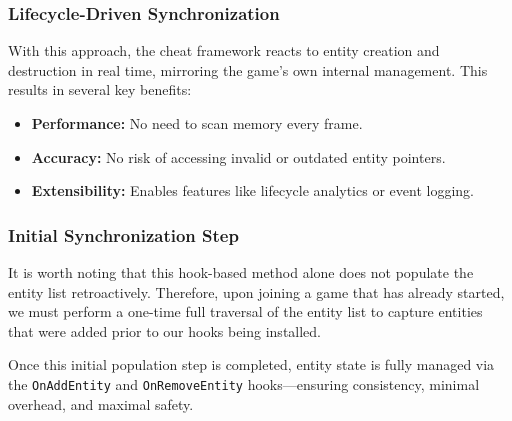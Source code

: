 \subsubsection*{Lifecycle-Driven Synchronization}

With this approach, the cheat framework reacts to entity creation and destruction in real time, mirroring the game’s own internal management. This results in several key benefits:

\begin{itemize}
    \item \textbf{Performance:} No need to scan memory every frame.
    \item \textbf{Accuracy:} No risk of accessing invalid or outdated entity pointers.
    \item \textbf{Extensibility:} Enables features like lifecycle analytics or event logging.
\end{itemize}

\subsubsection*{Initial Synchronization Step}

It is worth noting that this hook-based method alone does not populate the entity list retroactively. Therefore, upon joining a game that has already started, we must perform a one-time full traversal of the entity list to capture entities that were added prior to our hooks being installed.

Once this initial population step is completed, entity state is fully managed via the \texttt{OnAddEntity} and \texttt{OnRemoveEntity} hooks—ensuring consistency, minimal overhead, and maximal safety.
